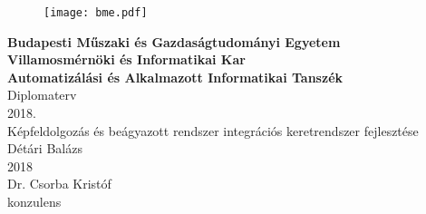 \begin{titlepage}

\begin{figure}
\centering
\texttt{[image: bme.pdf]}
\end{figure}

\centering
\textbf{Budapesti Műszaki és Gazdaságtudományi Egyetem}\\
\textbf{Villamosmérnöki és Informatikai Kar}\\
\textbf{Automatizálási és Alkalmazott Informatikai Tanszék}\\
\vspace{30mm}
\Huge
Diplomaterv\\
2018.\\
\vspace{40mm}
\Large
Képfeldolgozás és beágyazott rendszer integrációs keretrendszer fejlesztése\\
\vspace{10mm}
\Large
Détári Balázs\\
\vspace{10mm}
2018\\
\vspace{25mm}
\Large
\hfill Dr. Csorba Kristóf\\
\normalsize
\hfill konzulens

\end{titlepage}